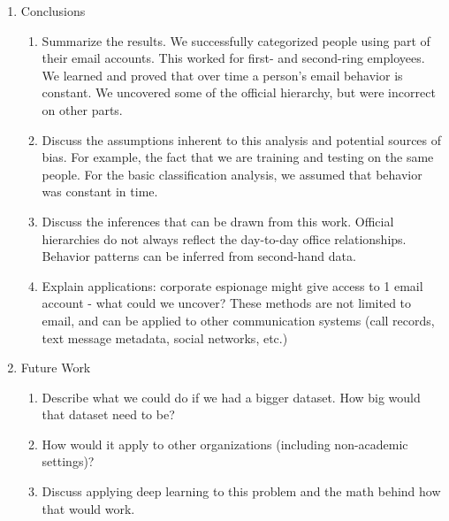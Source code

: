 \documentclass[12pt,dvips]{report}
\begin{document}
\begin{enumerate}
\begin{enumerate}
\end{enumerate}

\item Conclusions
\begin{enumerate}
\item Summarize the results.  We successfully categorized people using part of their email accounts.  This worked for first- and second-ring employees.  We learned and proved that over time a person's email behavior is constant.  We uncovered some of the official hierarchy, but were incorrect on other parts.
\item Discuss the assumptions inherent to this analysis and potential sources of bias.  For example, the fact that we are training and testing on the same people.  For the basic classification analysis, we assumed that behavior was constant in time.
\item Discuss the inferences that can be drawn from this work.  Official hierarchies do not always reflect the day-to-day office relationships.  Behavior patterns can be inferred from second-hand data.
\item Explain applications: corporate espionage might give access to 1 email account - what could we uncover?  These methods are not limited to email, and can be applied to other communication systems (call records, text message metadata, social networks, etc.)
\end{enumerate}

\item Future Work
\begin{enumerate}
\item Describe what we could do if we had a bigger dataset.  How big would that dataset need to be?
\item How would it apply to other organizations (including non-academic settings)?

\item Discuss applying deep learning to this problem and the math behind how that would work.
\end{enumerate}

\end{enumerate}
\end{document}
